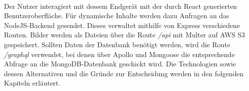 \paragraph{}
Der Nutzer interagiert mit dessem Endgerät mit der durch React generierten Benutzeroberfläche.
Für dynamische Inhalte werden dazu Anfragen an das NodeJS-Backend gesendet.
Dieses verwaltet mithilfe von Express verschiedene Routen.
Bilder werden als Dateien über die Route \textit{/api} mit Multer auf AWS S3 gespeichert.
Sollten Daten der Datenbank benötigt werden, wird die Route \textit{/graphql} verwendet, bei denen über Apollo und Mongoose die entsprechende Abfrage an die MongoDB-Datenbank geschickt wird. 
Die Technologien sowie dessen Alternativen und die Gründe zur Entscheidung werden in den folgenden Kapiteln erläutert.

